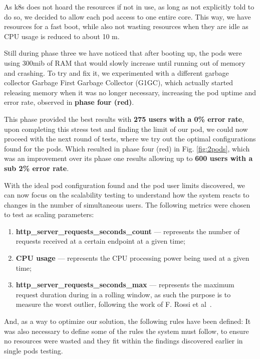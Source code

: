 As \acrshort{k8s} does not hoard the resources if not in use, as long as not explicitly told to do so, we decided to allow each pod access to one entire core. This way, we have resources for a fast boot, while also not wasting resources when they are idle as CPU usage is reduced to about 10 \acrshort{m}.

Still during phase three we have noticed that after booting up, the pods were using 300\acrshort{mib} of RAM that would slowly increase until running out of memory and crashing. To try and fix it, we experimented with a different garbage collector Garbage First Garbage Collector (G1GC), which actually started releasing memory when it was no longer necessary, increasing the pod uptime and error rate, observed in \textbf{phase four (red)}.

This phase provided the best results with \textbf{275 users with a 0\% error rate}, upon completing this stress test and finding the limit of our pod, we could now proceed with the next round of tests, where we try out the optimal configurations found for the pods. Which resulted in phase four (red) in Fig. \ref{fig:2pods}, which was an improvement over its phase one results allowing up to \textbf{600 users with a sub 2\% error rate}.

With the ideal pod configuration found and the pod user limits discovered, we can now focus on the scalability testing to understand how the system reacts to changes in the number of simultaneous users. The following metrics were chosen to test as scaling parameters:

\begin{enumerate}
    \item \textbf{http\_server\_requests\_seconds\_count} --- represents the number of requests received at a certain endpoint at a given time;
    \item \textbf{CPU usage} --- represents the CPU processing power being used at a given time;
    \item \textbf{http\_server\_requests\_seconds\_max} --- represents the maximum request duration during in a rolling window, as such the purpose is to measure the worst outlier, following the work of F. Rossi et al~\cite{rossi2020hierarchical}.
\end{enumerate}

And, as a way to optimize our solution, the following rules have been defined: 
It was also necessary to define some of the rules the system must follow, to ensure no resources were wasted and they fit within the findings discovered earlier in single pods testing.

